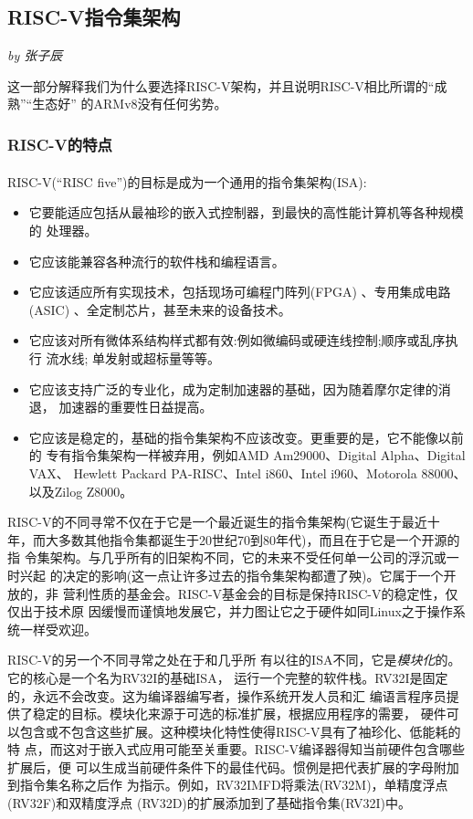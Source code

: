 \documentclass[UTF8,fontset=none,linespread=1.15]{ctexart}
\let\nosupcite\cite
\renewcommand*{\cite}[1]{\textsuperscript{\nosupcite{#1}}}
\newcommand{\sectionauthor}[1]{%
\vspace*{-5ex}
\noindent\textrm{\hfill\textit{by #1}}
\vspace*{2ex}\par}
\begin{document}
\subsection{RISC-V指令集架构}\sectionauthor{张子辰}
这一部分解释我们为什么要选择RISC-V架构，并且说明RISC-V相比所谓的“成熟”“生态好”
的ARMv8没有任何劣势。

\subsubsection{RISC-V的特点}
RISC-V(“RISC five”)的目标是成为一个通用的指令集架构(ISA):\cite{bib:risc-v-manual}
\begin{itemize}
\item 它要能适应包括从最袖珍的嵌入式控制器，到最快的高性能计算机等各种规模的
处理器。
\item 它应该能兼容各种流行的软件栈和编程语言。
\item 它应该适应所有实现技术，包括现场可编程门阵列(FPGA)
 、专用集成电路(ASIC) 、全定制芯片，甚至未来的设备技术。
\item 它应该对所有微体系结构样式都有效:例如微编码或硬连线控制;顺序或乱序执行
流水线; 单发射或超标量等等。
\item 它应该支持广泛的专业化，成为定制加速器的基础，因为随着摩尔定律的消退，
加速器的重要性日益提高。
\item 它应该是稳定的，基础的指令集架构不应该改变。更重要的是，它不能像以前的
专有指令集架构一样被弃用，例如AMD Am29000、Digital Alpha、Digital VAX、
Hewlett Packard PA-RISC、Intel i860、Intel i960、Motorola 88000、以及Zilog
Z8000。
\end{itemize}

RISC-V的不同寻常不仅在于它是一个最近诞生的指令集架构(它诞生于最近十
年，而大多数其他指令集都诞生于20世纪70到80年代)，而且在于它是一个开源的指
令集架构。与几乎所有的旧架构不同，它的未来不受任何单一公司的浮沉或一时兴起
的决定的影响(这一点让许多过去的指令集架构都遭了殃)。它属于一个开放的，非
营利性质的基金会。RISC-V基金会的目标是保持RISC-V的稳定性，仅仅出于技术原
因缓慢而谨慎地发展它，并力图让它之于硬件如同Linux之于操作系统一样受欢迎。

RISC-V的另一个不同寻常之处在于和几乎所
有以往的ISA不同，它是\textit{模块化}的。它的核心是一个名为RV32I的基础ISA，
运行一个完整的软件栈。RV32I是固定的，永远不会改变。这为编译器编写者，操作系统开发人员和汇
编语言程序员提供了稳定的目标。模块化来源于可选的标准扩展，根据应用程序的需要，
硬件可以包含或不包含这些扩展。这种模块化特性使得RISC-V具有了袖珍化、低能耗的特
点，而这对于嵌入式应用可能至关重要。RISC-V编译器得知当前硬件包含哪些扩展后，便
可以生成当前硬件条件下的最佳代码。惯例是把代表扩展的字母附加到指令集名称之后作
为指示。例如，RV32IMFD将乘法(RV32M)，单精度浮点(RV32F)和双精度浮点
(RV32D)的扩展添加到了基础指令集(RV32I)中。
\end{document}
